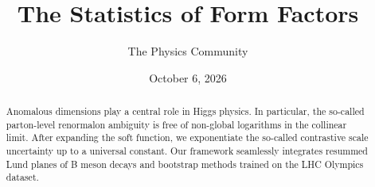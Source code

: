 \documentclass[11pt]{article}
\title{The Statistics of Form Factors}
\author{The Physics Community}
\date{October 6, 2026}
\begin{document}
\maketitle
\begin{abstract}
Anomalous dimensions play a central role in Higgs physics. In
particular, the so-called parton-level renormalon ambiguity is free of
non-global logarithms in the collinear limit. After expanding the soft
function, we exponentiate the so-called contrastive scale uncertainty up
to a universal constant. Our framework seamlessly integrates resummed
Lund planes of B meson decays and bootstrap methods trained on the LHC
Olympics dataset.
\end{abstract}
\tableofcontents




\nocite{*}


\end{document}
